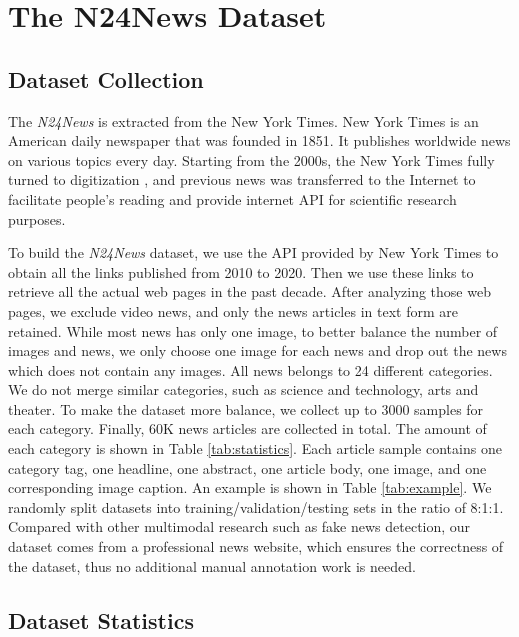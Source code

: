 \documentclass[10pt, a4paper]{article}
\begin{document}
\section{The N24News Dataset}

\subsection{Dataset Collection}
The \textit{N24News} is extracted from the New York Times. New York Times is an American daily newspaper that was founded in 1851. It publishes worldwide news on various topics every day. Starting from the 2000s, the New York Times fully turned to digitization \cite{perez2008times}, and previous news was transferred to the Internet to facilitate people's reading and provide internet API for scientific research purposes.

To build the \textit{N24News} dataset, we use the API provided by New York Times to obtain all the links published from 2010 to 2020. Then we use these links to retrieve all the actual web pages in the past decade. After analyzing those web pages, we exclude video news, and only the news articles in text form are retained. While most news has only one image, to better balance the number of images and news, we only choose one image for each news and drop out the news which does not contain any images.
All news belongs to 24 different categories. We do not merge similar categories, such as science and technology, arts and theater. To make the dataset more balance, we collect up to 3000 samples for each category.
Finally, 60K news articles are collected in total. The amount of each category is shown in Table \ref{tab:statistics}. Each article sample contains one category tag, one headline, one abstract, one article body, one image, and one corresponding image caption. An example is shown in Table \ref{tab:example}. 
We randomly split datasets into training/validation/testing sets in the ratio of 8:1:1. Compared with other multimodal research such as fake news detection, our dataset comes from a professional news website, which ensures the correctness of the dataset, thus no additional manual annotation work is needed.



\subsection{Dataset Statistics}
\end{document}

